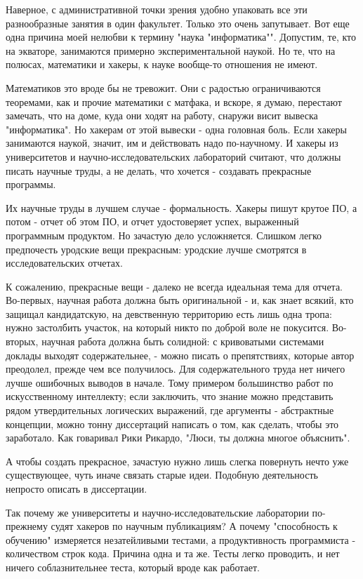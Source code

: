 \documentclass[ebook,12pt,oneside,openany]{memoir}
\begin{document}
Наверное, с административной точки зрения удобно упаковать все эти
разнообразные занятия в один факультет. Только это очень запутывает.
Вот еще одна причина моей нелюбви к термину "наука "информатика"".
Допустим, те, кто на экваторе, занимаются примерно экспериментальной
наукой. Но те, что на полюсах, математики и хакеры, к науке вообще-то
отношения не имеют.

Математиков это вроде бы не тревожит. Они с радостью ограничиваются
теоремами, как и прочие математики с матфака, и вскоре, я думаю,
перестают замечать, что на доме, куда они ходят на работу, снаружи
висит вывеска "информатика". Но хакерам от этой вывески - одна
головная боль. Если хакеры занимаются наукой, значит, им и действовать
надо по-научному. И хакеры из университетов и научно-исследовательских
лабораторий считают, что должны писать научные труды, а не делать, что
хочется - создавать прекрасные программы.

Их научные труды в лучшем случае - формальность. Хакеры пишут крутое
ПО, а потом - отчет об этом ПО, и отчет удостоверяет успех, выраженный
программным продуктом. Но зачастую дело усложняется. Слишком легко
предпочесть уродские вещи прекрасным: уродские лучше смотрятся в
исследовательских отчетах.

К сожалению, прекрасные вещи - далеко не всегда идеальная тема для
отчета. Во-первых, научная работа должна быть оригинальной - и, как
знает всякий, кто защищал кандидатскую, на девственную территорию есть
лишь одна тропа: нужно застолбить участок, на который никто по доброй
воле не покусится. Во-вторых, научная работа должна быть солидной: с
кривоватыми системами доклады выходят содержательнее, - можно писать о
препятствиях, которые автор преодолел, прежде чем все получилось. Для
содержательного труда нет ничего лучше ошибочных выводов в начале.
Тому примером большинство работ по искусственному интеллекту; если
заключить, что знание можно представить рядом утвердительных
логических выражений, где аргументы - абстрактные концепции, можно
тонну диссертаций написать о том, как сделать, чтобы это заработало.
Как говаривал Рики Рикардо, "Люси, ты должна многое объяснить".

А чтобы создать прекрасное, зачастую нужно лишь слегка повернуть нечто
уже существующее, чуть иначе связать старые идеи. Подобную
деятельность непросто описать в диссертации.

Так почему же университеты и научно-исследовательские лаборатории
по-прежнему судят хакеров по научным публикациям? А почему
"способность к обучению" измеряется незатейливыми тестами, а
продуктивность программиста - количеством строк кода. Причина одна и
та же. Тесты легко проводить, и нет ничего соблазнительнее теста,
который вроде как работает.
\end{document}
